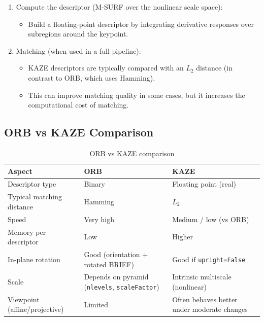 \begin{enumerate}
    \item Compute the descriptor (M-SURF over the nonlinear scale space):
    \begin{itemize}
        \item Build a floating-point descriptor by integrating derivative responses over subregions around the keypoint.
    \end{itemize}

    \item Matching (when used in a full pipeline):
    \begin{itemize}
        \item KAZE descriptors are typically compared with an $L_2$ distance (in contrast to ORB, which uses Hamming).
        \item This can improve matching quality in some cases, but it increases the computational cost of matching.
    \end{itemize}
\end{enumerate}

\subsection{ORB vs KAZE Comparison}

\begin{table}[!t]
    \centering
    \caption{ORB vs KAZE comparison}
    \label{tab:orb_vs_kaze}
    \begingroup
    \footnotesize
    \setlength{\tabcolsep}{3pt}
    \renewcommand{\arraystretch}{1.15}
    \begin{tabularx}{\columnwidth}{@{}L{0.24\columnwidth}YY@{}}
        \hline
        \textbf{Aspect} & \textbf{ORB} & \textbf{KAZE} \\
        \hline
        Descriptor type & Binary & Floating point (real) \\
        Typical matching distance & Hamming & $L_2$ \\
        Speed & Very high & Medium / low (vs ORB) \\
        Memory per descriptor & Low & Higher \\
        In-plane rotation & Good (orientation + rotated BRIEF) & Good if \texttt{upright=False} \\
        Scale & Depends on pyramid (\texttt{nlevels}, \texttt{scaleFactor}) & Intrinsic multiscale (nonlinear) \\
        Viewpoint (affine/projective) & Limited & Often behaves better under moderate changes \\
        \hline
    \end{tabularx}
    \endgroup
\end{table}

